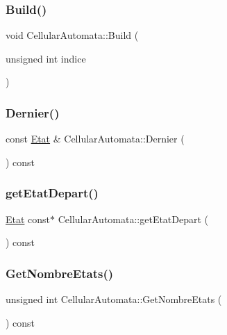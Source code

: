 \subsubsection{\texorpdfstring{Build()}{Build()}}
{\footnotesize\ttfamily void Cellular\+Automata\+::\+Build (\begin{DoxyParamCaption}\item[{unsigned int}]{indice }\end{DoxyParamCaption})\hspace{0.3cm}{\ttfamily [private]}}

\mbox{\label{class_cellular_automata_a42291e2737e23c206e44f074d13323f7}} 
\subsubsection{\texorpdfstring{Dernier()}{Dernier()}}
{\footnotesize\ttfamily const \mbox{\hyperlink{class_etat}{Etat}} \& Cellular\+Automata\+::\+Dernier (\begin{DoxyParamCaption}{ }\end{DoxyParamCaption}) const}

\mbox{\label{class_cellular_automata_a28ebffd21b4b0f297a0ceea6f8648421}} 
\subsubsection{\texorpdfstring{get\+Etat\+Depart()}{getEtatDepart()}}
{\footnotesize\ttfamily \mbox{\hyperlink{class_etat}{Etat}} const$\ast$ Cellular\+Automata\+::get\+Etat\+Depart (\begin{DoxyParamCaption}{ }\end{DoxyParamCaption}) const\hspace{0.3cm}{\ttfamily [inline]}}

\mbox{\label{class_cellular_automata_a50fd8f8ee143b72c09107553d7ae04c8}} 
\subsubsection{\texorpdfstring{Get\+Nombre\+Etats()}{GetNombreEtats()}}
{\footnotesize\ttfamily unsigned int Cellular\+Automata\+::\+Get\+Nombre\+Etats (\begin{DoxyParamCaption}{ }\end{DoxyParamCaption}) const\hspace{0.3cm}{\ttfamily [inline]}}


